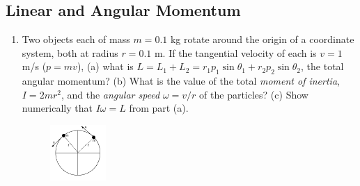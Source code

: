 \documentclass[10pt]{article}
\begin{document}
\subsection{Linear and Angular Momentum}
\begin{enumerate}
\item Two objects each of mass $m = 0.1$ kg rotate around the origin of a coordinate system, both at radius $r = 0.1$ m.  If the tangential velocity of each is $v = 1$ m/s ($p = mv$), (a) what is $L = L_1 + L_2 = r_1 p_1\sin\theta_1+r_2 p_2\sin\theta_2$, the total angular momentum?  (b) What is the value of the total \textit{moment of inertia}, $I = 2mr^2$, and the \textit{angular speed} $\omega = v/r$ of the particles?  (c) Show numerically that $I\omega = L$ from part (a).
\begin{figure}[hb]
\centering
\includegraphics[width=0.2\textwidth]{rotate.pdf}
\end{figure}
\end{enumerate}
\end{document}
